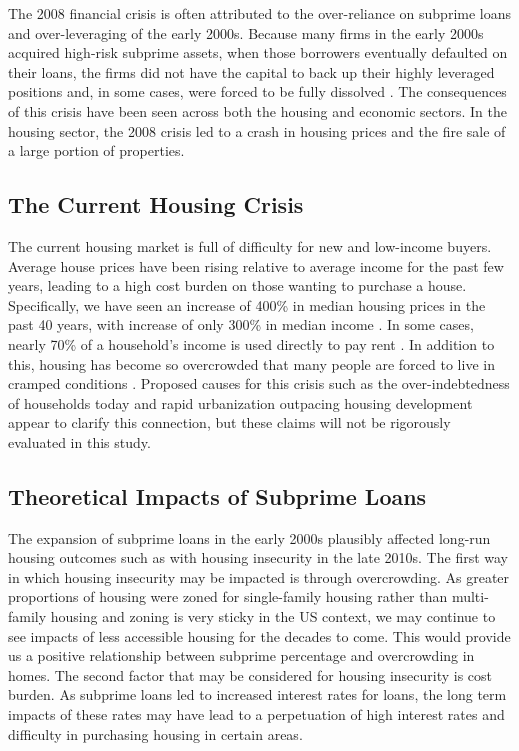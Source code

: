 \documentclass{article}
\begin{document}
The 2008 financial crisis is often attributed to the over-reliance on subprime loans and over-leveraging of the early 2000s. Because many firms in the early 2000s acquired high-risk subprime assets, when those borrowers eventually defaulted on their loans, the firms did not have the capital to back up their highly leveraged positions and, in some cases, were forced to be fully dissolved \cite{lioudis_lehman_brothers}. The consequences of this crisis have been seen across both the housing and economic sectors. In the housing sector, the 2008 crisis led to a crash in housing prices and the fire sale of a large portion of properties.

\subsection{The Current Housing Crisis}

The current housing market is full of difficulty for new and low-income buyers. Average house prices have been rising relative to average income for the past few years, leading to a high cost burden on those wanting to purchase a house. Specifically, we have seen an increase of 400\% in median housing prices in the past 40 years, with increase of only 300\% in median income \cite{richter2026houseprices}. In some cases, nearly 70\% of a household's income is used directly to pay rent \cite{nlihc_problem}. In addition to this, housing has become so overcrowded that many people are forced to live in cramped conditions \cite{naeh_state_of_homelessness}. Proposed causes for this crisis such as the over-indebtedness of households today and rapid urbanization outpacing housing development appear to clarify this connection, but these claims will not be rigorously evaluated in this study. 

\subsection{Theoretical Impacts of Subprime Loans}

The expansion of subprime loans in the early 2000s plausibly affected long-run housing outcomes such as with housing insecurity in the late 2010s. The first way in which housing insecurity may be impacted is through overcrowding. As greater proportions of housing were zoned for single-family housing rather than multi-family housing and zoning is very sticky in the US context, we may continue to see impacts of less accessible housing for the decades to come. This would provide us a positive relationship between subprime percentage and overcrowding in homes. The second factor that may be considered for housing insecurity is cost burden. As subprime loans led to increased interest rates for loans, the long term impacts of these rates may have lead to a perpetuation of high interest rates and difficulty in purchasing housing in certain areas.
\end{document}
